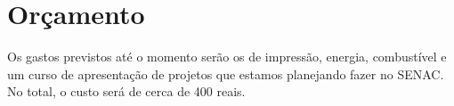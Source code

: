 \section{Orçamento}

\par Os gastos previstos até o momento serão os de impressão, energia, combustível e um
curso de apresentação de projetos que estamos planejando fazer no SENAC. No
total, o custo será de cerca de 400 reais. 

% 
% 
% 
%    	
% 
% 
%   
% 
%  
